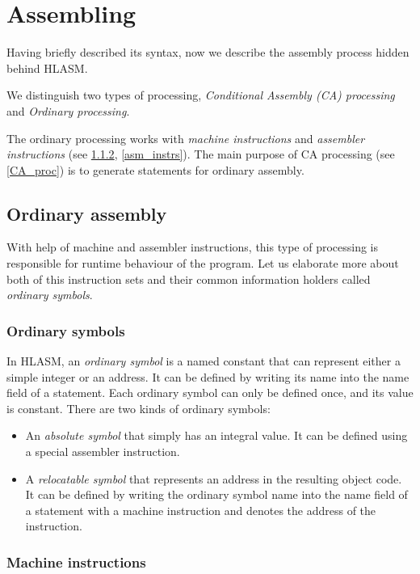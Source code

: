 \section{Assembling}
\label{Assembling}

Having briefly described its syntax, now we describe the assembly process hidden behind HLASM. 

We distinguish two types of processing, \emph{Conditional Assembly (CA) processing} and \emph{Ordinary processing}.

The ordinary processing works with \emph{machine instructions} and \emph{assembler instructions} (see \cref{mach_instr}, \cref{asm_instrs}). The main purpose of CA processing (see \cref{CA_proc}) is to generate statements for ordinary assembly.

\subsection{Ordinary assembly}

With help of machine and assembler instructions, this type of processing is responsible for runtime behaviour of the program. Let us elaborate more about both of this instruction sets and their common information holders called \emph{ordinary symbols}.

\subsubsection{Ordinary symbols}

In HLASM, an \emph{ordinary symbol} is a named constant that can represent either a simple integer or an address. It can be defined by writing its name into the name field of a statement. Each ordinary symbol can only be defined once, and its value is constant. There are two kinds of ordinary symbols:
\begin{itemize}
	\item An \emph{absolute symbol} that simply has an integral value. It can be defined using a special assembler instruction.
	\item A \emph{relocatable symbol} that represents an address in the resulting object code. It can be defined by writing the ordinary symbol name into the name field of a statement with a machine instruction and denotes the address of the instruction.
\end{itemize}

\subsubsection{Machine instructions}
\label{mach_instr}

